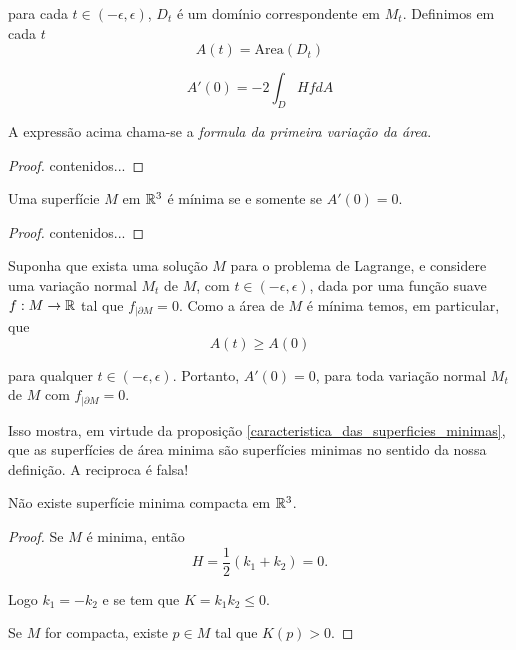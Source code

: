 para cada $t \in (-\epsilon,\epsilon)$, $D_t$ é um domínio correspondente em $M_t$. Definimos em cada $t$
\begin{equation*}
	A(t) = \text{Area}(D_t)
\end{equation*}

\begin{teo}
	\begin{equation*}
		A'(0) = -2 \int_D Hf dA
	\end{equation*}
\end{teo}

A expressão acima chama-se a \emph{formula da primeira variação da área}.

\begin{proof}
	contenidos...
\end{proof}

\begin{prop}\label{caracteristica_das_superficies_minimas}
	Uma superfície $M$ em $\mathbb{R}^3$ é mínima se e somente se $A'(0) = 0$.
\end{prop}

\begin{proof}
	contenidos...
\end{proof}

\begin{obse}
	Suponha que exista uma solução $M$ para o problema de Lagrange, e considere uma variação normal $M_t$ de $M$, com $t \in (-\epsilon,\epsilon)$, dada por uma função suave $f: M \rightarrow \mathbb{R}$ tal que $f_{|\partial M} = 0$. Como a área de $M$ é mínima temos, em particular, que
	\begin{equation*}
		A(t) \geq A(0)
	\end{equation*}
	
	para qualquer $t \in (-\epsilon,\epsilon)$. Portanto, $A'(0)=0$, para toda variação normal $M_t$ de $M$ com $f_{|\partial M}=0$.
	
	Isso mostra, em virtude da proposição \ref{caracteristica_das_superficies_minimas}, que as superfícies de área minima são superfícies minimas no sentido da nossa definição. A reciproca é falsa!
\end{obse}

\begin{prop}
	Não existe superfície minima compacta em $\mathbb{R}^3$.
\end{prop}

\begin{proof}
	Se $M$ é minima, então
	\begin{equation*}
		H = \frac{1}{2} (k_1 + k_2) = 0.
	\end{equation*}
	
	Logo $k_1 = -k_2$ e se tem que $K = k_1 k_2 \leq 0$.
	
	Se $M$ for compacta, existe $p \in M$ tal que $K(p) > 0$.
\end{proof}

